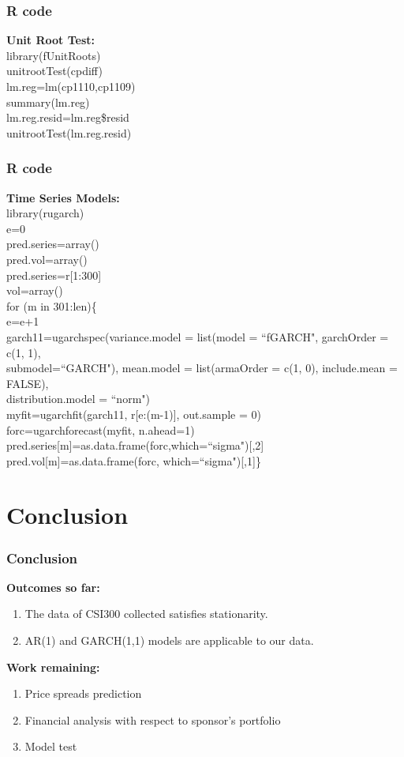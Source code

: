 \documentclass[compress,handout,10pt]{beamer}
\let\olditem\item
\renewcommand{\item}{\setlength{\itemsep}{0.5\baselineskip}\olditem}
\begin{document}
\begin{frame}
    \frametitle{R code}
{\bf{Unit Root Test:}}\\
library(fUnitRoots)\\
unitrootTest(cpdiff)\\
lm.reg=lm(cp1110,cp1109)\\
summary(lm.reg)\\
lm.reg.resid=lm.reg\$resid\\
unitrootTest(lm.reg.resid)\\
\end{frame}
\begin{frame}
    \frametitle{R code}
{\bf{Time Series Models:}}\\
library(rugarch)\\
e=0\\
pred.series=array()\\
pred.vol=array()\\
pred.series=r[1:300]\\
vol=array()\\
for (m in 301:len)\{\\
  e=e+1\\
  garch11=ugarchspec(variance.model = list(model = ``fGARCH", garchOrder = c(1, 1),\\ submodel=``GARCH"), mean.model = list(armaOrder = c(1, 0), include.mean = FALSE),\\ distribution.model = ``norm")\\
  myfit=ugarchfit(garch11, r[e:(m-1)], out.sample = 0)\\
  forc=ugarchforecast(myfit, n.ahead=1)\\
  pred.series[m]=as.data.frame(forc,which=``sigma")[,2]\\
  pred.vol[m]=as.data.frame(forc, which=``sigma")[,1]\}

\end{frame}

\section{Conclusion}
\begin{frame}
    \frametitle{Conclusion}
{\bf{Outcomes so far:}}\\
\begin{enumerate}
\item The data of CSI300 collected satisfies stationarity.
\item AR(1) and GARCH(1,1) models are applicable to our data. 
\end{enumerate}
{\bf{Work remaining:}}\\
\begin{enumerate}
\item Price spreads prediction
\item Financial analysis with respect to sponsor's portfolio
\item Model test
\end{enumerate}  
\end{frame}
\end{document}
